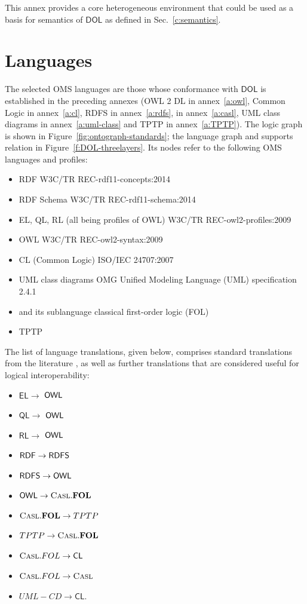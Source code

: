 \documentclass[10pt,fleqn,final]{scrreprt}
\newcommand*{\CL}{\ensuremath{\mathsf{CL}}\xspace}
\newcommand{\QL}{\ensuremath{\mathsf{QL}}\xspace}
\newcommand{\RL}{\ensuremath{\mathsf{RL}}\xspace}
\newcommand{\EL}{\ensuremath{\mathsf{EL}}\xspace}
\newcommand*{\DOL}{\ensuremath{\mathsf{DOL}}\xspace}
\newcommand{\annexrefname}{annex}
\newcommand{\figurerefname}{Figure}
\newcommand{\aref}[1]{\annexrefname~\ref{#1}}
\newcommand{\fref}[1]{\figurerefname~\ref{#1}}
\newcommand{\sclause}[1]{\section{#1}}
\newcommand{\nisref}[1]{#1}
\newenvironment{definitions}[0]{\medskip }{}
\begin{document}
\begin{definitions}
This annex provides a core heterogeneous environment that could be used as a basis for 
semantics of \DOL as defined in Sec.~\ref{c:semantics}.

\sclause{Languages}
 
 The selected OMS languages
are those whose conformance with \DOL is established in the preceding annexes (OWL 2 DL in \aref{a:owl}, Common Logic in \aref{a:cl}, RDFS in \aref{a:rdfs},
\CASL in \aref{a:casl}, UML class diagrams in \aref{a:uml-class} and TPTP in \aref{a:TPTP}).  The logic graph is shown in \fref{fig:ontograph-standards}; the language graph and supports relation in \fref{f:DOL-threelayers}.  Its nodes refer to the following OMS languages and profiles:
\begin{itemize}
\item RDF \nisref{W3C/TR REC-rdf11-concepts:2014}
\item RDF Schema \nisref{W3C/TR REC-rdf11-schema:2014}
\item EL, QL, RL (all being profiles of OWL) \nisref{W3C/TR REC-owl2-profiles:2009}
\item OWL \nisref{W3C/TR REC-owl2-syntax:2009}
\item CL (Common Logic) \nisref{ISO/IEC 24707:2007}
\item UML class diagrams \nisref{OMG Unified Modeling Language (UML) specification 2.4.1}
\item \CASL \cite{CASL-RM} and its sublanguage classical first-order logic (FOL)
\item TPTP
\end{itemize}

 The list of
language translations, given below, comprises standard translations from the literature  \cite{OntoGraph,MossakowskiEtAl14b},
as well as further translations that are considered useful for
logical interoperability:
\begin{itemize}
  \item \EL $\to$ $\mathsf{OWL}$ 
  \item \QL $\to$ $\mathsf{OWL}$
  \item \RL $\to$ $\mathsf{OWL}$
  \item $\mathsf{RDF} \to \mathsf{RDFS}$
  \item $\mathsf{RDFS} \to \mathsf{OWL}$
  \item $\mathsf{OWL}  \to \textmd{\textsc{Casl}}.\mathbf{FOL}$
  \item $\textmd{\textsc{Casl}}.\mathbf{FOL} \to TPTP$
  \item $TPTP \to \textmd{\textsc{Casl}}.\mathbf{FOL}$
  \item $\CASL.FOL \to \CL$
  \item $\textmd{\textsc{Casl}}.FOL \to \textmd{\textsc{Casl}}$
  \item $UML-CD \to \CL$.
\end{itemize}


\end{definitions}
\end{document}
